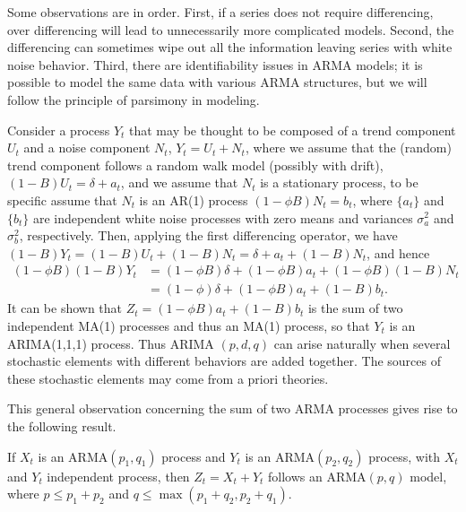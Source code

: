 Some observations are in order. First, if a series does not require differencing, over differencing will lead to unnecessarily more complicated models. Second, the differencing can sometimes wipe out all the information leaving series with white noise behavior. Third, there are identifiability issues in ARMA models; it is possible to model the same data with various ARMA structures, but we will follow the principle of parsimony in modeling. 


\begin{ex}
Consider a process $Y_t$ that may be thought to be composed of a trend component $U_t$ and a noise component $N_t$, $Y_t = U_t + N_t$, where we assume that the (random) trend component follows a random walk model (possibly with drift), $(1 - B)U_t = \delta + a_t$, and we assume that $N_t$ is a stationary process, to be specific assume that $N_t$ is an AR(1) process $(1 - \phi B)N_t = b_t$, where $\{a_t\}$ and $\{b_t\}$ are independent white noise processes with zero means and variances $\sigma_a^2$ and $\sigma_b^2$, respectively. Then, applying the first differencing operator, we have $(1 - B)Y_t = (1 - B)U_t + (1 - B)N_t = \delta + a_t + (1 - B)N_t$, and hence
	\begin{equation}\label{eqn:bphi}
	\begin{split}
	(1 - \phi B)(1 - B)Y_t&= (1 - \phi B)\delta + (1 - \phi B)a_t + (1 - \phi B)(1 - B)N_t \\
	&= (1 - \phi)\delta + (1 - \phi B)a_t + (1 - B)b_t.
	\end{split}
	\end{equation}
It can be shown that $Z_t = (1 - \phi B)a_t + (1 - B)b_t$ is the sum of two independent MA(1) processes and thus an MA(1) process, so that $Y_t$ is an ARIMA(1,1,1) process. Thus ARIMA $(p, d, q)$ can arise naturally when several stochastic elements with different behaviors are added together. The sources of these stochastic elements may come from a priori theories. 
\end{ex}

This general observation concerning the sum of two ARMA processes gives rise to the following result. 

\begin{result}[Aggregation]\label{thm:agg}
If $X_t$ is an ARMA$(p_1,q_1)$ process and $Y_t$ is an ARMA$(p_2,q_2)$ process, with $X_t$ and $Y_t$ independent process, then $Z_t = X_t + Y_t$ follows an ARMA$(p,q)$ model, where $p \leq p_1 + p_2$ and $q \leq \max(p_1 + q_2, p_2 + q_1)$.
\end{result}


